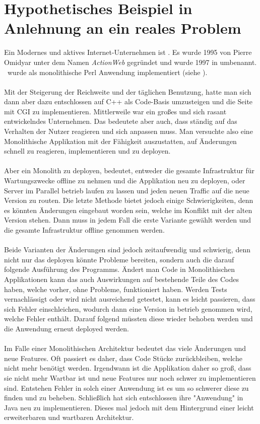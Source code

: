 \section[Beispiel]{Hypothetisches Beispiel in Anlehnung an ein reales Problem}
\label{sec:beispielEbay}
Ein Modernes und aktives Internet-Unternehmen ist \ebay . Es wurde 1995 von Pierre Omidyar unter dem Namen \textit{ActionWeb} gegründet und wurde 1997 in \ebay umbenannt. \ebay\ wurde als monolithische Perl Anwendung implementiert (siehe \cite{wiki:ebay}). 
\\\\
Mit der Steigerung der Reichweite und der täglichen Benutzung, hatte man sich dann aber dazu entschlossen auf C++ als Code-Basis umzusteigen und die Seite mit CGI zu implementieren. Mittlerweile war \ebay ein großes und sich rasant entwickelndes Unternehmen. Das bedeutete aber auch, dass \ebay ständig auf das Verhalten der Nutzer reagieren und sich anpassen muss. Man versuchte also eine Monolithische Applikation mit der Fähigkeit auszustatten, auf Änderungen schnell zu reagieren, implementieren und zu deployen.
\\\\
Aber ein Monolith zu deployen, bedeutet, entweder die gesamte Infrastruktur für Wartungszwecke offline zu nehmen und die Applikation neu zu deployen, oder Server im Parallel betrieb laufen zu lassen und jeden neuen Traffic auf die neue Version zu routen. Die letzte Methode bietet jedoch einige Schwierigkeiten, denn es könnten Änderungen eingebaut worden sein, welche im Konflikt mit der alten Version stehen. Dann muss in jedem Fall die erste Variante gewählt werden und die gesamte Infrastruktur offline genommen werden.
\\\\
Beide Varianten der Änderungen sind jedoch zeitaufwendig und  schwierig, denn nicht nur das deployen könnte Probleme bereiten, sondern auch die darauf folgende Ausführung des Programms. Ändert man Code in Monolithischen Applikationen kann das auch Auswirkungen auf bestehende Teile des Codes haben, welche vorher, ohne Probleme, funktioniert haben. Werden Tests vernachlässigt oder wird nicht ausreichend getestet, kann es leicht passieren, dass sich Fehler einschleichen, wodurch dann eine Version in betrieb genommen wird, welche Fehler enthält. Darauf folgend müssten diese wieder behoben werden und die Anwendung erneut deployed werden.
\\\\
Im Falle einer Monolithischen Architektur bedeutet das viele Änderungen und neue Features. Oft passiert es daher, dass Code Stücke zurückbleiben, welche nicht mehr benötigt werden. Irgendwann ist die Applikation daher so groß, dass sie nicht mehr Wartbar ist und neue Features nur noch schwer zu implementieren sind. Entstehen Fehler in solch einer Anwendung ist es um so schwerer diese zu finden und zu beheben. Schließlich hat sich \ebay entschlossen ihre "Anwendung" in Java neu zu implementieren. Dieses mal jedoch mit dem Hintergrund einer leicht erweiterbaren und wartbaren Architektur.

